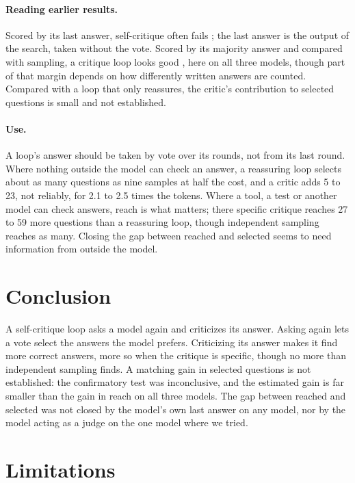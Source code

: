 \documentclass[11pt]{article}
\begin{document}
\paragraph{Reading earlier results.}
Scored by its last answer, self-critique often fails \citep{huang2024cannot,stechly2024selfverification}; the last answer is the output of the search, taken without the vote.
Scored by its majority answer and compared with sampling, a critique loop looks good \citep{bilal2026refining}, here on all three models, though part of that margin depends on how differently written answers are counted.
Compared with a loop that only reassures, the critic's contribution to selected questions is small and not established.

\paragraph{Use.}
A loop's answer should be taken by vote over its rounds, not from its last round.
Where nothing outside the model can check an answer, a reassuring loop selects about as many questions as nine samples at half the cost, and a critic adds 5 to 23, not reliably, for 2.1 to 2.5 times the tokens.
Where a tool, a test or another model can check answers, reach is what matters; there specific critique reaches 27 to 59 more questions than a reassuring loop, though independent sampling reaches as many.
Closing the gap between reached and selected seems to need information from outside the model.

\section{Conclusion}

A self-critique loop asks a model again and criticizes its answer.
Asking again lets a vote select the answers the model prefers.
Criticizing its answer makes it find more correct answers, more so when the critique is specific, though no more than independent sampling finds.
A matching gain in selected questions is not established: the confirmatory test was inconclusive, and the estimated gain is far smaller than the gain in reach on all three models.
The gap between reached and selected was not closed by the model's own last answer on any model, nor by the model acting as a judge on the one model where we tried.

\section*{Limitations}
\end{document}
